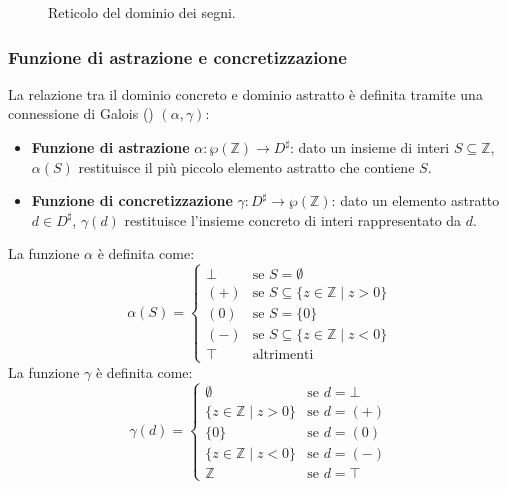 \begin{figure}[H]
    \centering
    \caption{Reticolo del dominio dei segni.}
    \label{fig:sign_lattice}
\end{figure}

\subsubsection{Funzione di astrazione e concretizzazione}

La relazione tra il dominio concreto e dominio astratto è definita tramite una
connessione di Galois () $(\alpha, \gamma)$:
\begin{itemize}
    \item \textbf{Funzione di astrazione} $\alpha: \wp(\mathbb{Z}) \to D^\sharp$:
    dato un insieme di interi $S \subseteq \mathbb{Z}$, $\alpha(S)$ restituisce
    il più piccolo elemento astratto che contiene $S$.
    \item \textbf{Funzione di concretizzazione} $\gamma: D^\sharp \to \wp(\mathbb{Z})$:
    dato un elemento astratto $d \in D^\sharp$, $\gamma(d)$ restituisce
    l'insieme concreto di interi rappresentato da $d$.
\end{itemize}

La funzione $\alpha$ è definita come:
\[
\alpha(S) =
\begin{cases}
    \bot & \text{se } S = \emptyset \\
    (+) & \text{se } S \subseteq \{z \in \mathbb{Z} \mid z > 0\} \\
    (0) & \text{se } S = \{0\} \\
    (-) & \text{se } S \subseteq \{z \in \mathbb{Z} \mid z < 0\} \\
    \top & \text{altrimenti}
\end{cases}
\]
La funzione $\gamma$ è definita come:
\[
\gamma(d) =
\begin{cases}
    \emptyset & \text{se } d = \bot \\
    \{z \in \mathbb{Z} \mid z > 0\} & \text{se } d = (+) \\
    \{0\} & \text{se } d = (0) \\
    \{z \in \mathbb{Z} \mid z < 0\} & \text{se } d = (-) \\
    \mathbb{Z} & \text{se } d = \top
\end{cases}
\]

